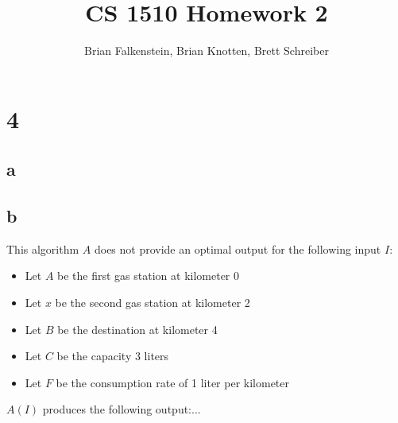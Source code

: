 \documentclass[letterpaper,notitlepage,twoside]{article}
\title{CS 1510 Homework 2}
\author{Brian Falkenstein, Brian Knotten, Brett Schreiber}
\begin{document}
\maketitle

\section*{4}
\subsection*{a}

\subsection*{b}
This algorithm $A$ does not provide an optimal output for the following input $I$:\\
\begin{itemize}
\item Let $A$ be the first gas station at kilometer 0
\item Let $x$ be the second gas station at kilometer 2
\item Let $B$ be the destination at kilometer 4
\item Let $C$ be the capacity 3 liters
\item Let $F$ be the consumption rate of 1 liter per kilometer
\end{itemize}
$A(I)$ produces the following output:...\\
\end{document}
